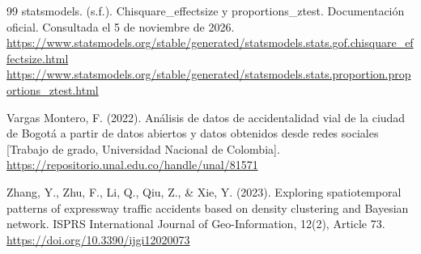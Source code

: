 \documentclass[12pt,letterpaper]{article}
\begin{document}
\begin{thebibliography}{99}
statsmodels. (s.f.). Chisquare\_effectsize y proportions\_ztest. Documentación oficial.
Consultada el 5 de noviembre de 2026.
\url{https://www.statsmodels.org/stable/generated/statsmodels.stats.gof.chisquare_effectsize.html}
\url{https://www.statsmodels.org/stable/generated/statsmodels.stats.proportion.proportions_ztest.html}

Vargas Montero, F. (2022). Análisis de datos de accidentalidad vial de
  la ciudad de Bogotá a partir de datos abiertos y datos obtenidos desde
  redes sociales {[}Trabajo de grado, Universidad Nacional de
  Colombia{]}. \url{https://repositorio.unal.edu.co/handle/unal/81571}

Zhang, Y., Zhu, F., Li, Q., Qiu, Z., \& Xie, Y. (2023). Exploring
  spatiotemporal patterns of expressway traffic accidents based on
  density clustering and Bayesian network. ISPRS International Journal
  of Geo-Information, 12(2), Article 73.
  \url{https://doi.org/10.3390/ijgi12020073}

\end{thebibliography}
\end{document}
